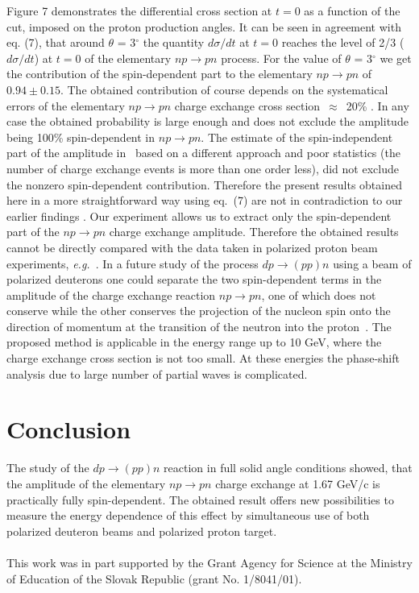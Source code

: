 \documentclass[epj]{svjour}
\begin{document}
Figure 7 demonstrates the differential cross section at $t=0$ as a function of
the cut, imposed on the proton production angles. It can be seen in agreement
with eq. (7), that around $\theta$ = 3$^\circ$ the quantity $d\sigma/dt$ at
$t=0$ reaches the level of 2/3 ($d\sigma/dt$) at $t=0$ of the elementary
$np\to pn$ process. For the value of $\theta$ = 3$^\circ$ we get the
contribution of the spin-dependent part to the elementary $np\to pn$ of
$0.94 \pm 0.15$. The obtained contribution of course depends on the systematical
errors of the elementary $np\to pn$ charge exchange cross section~$\approx$~20\%
\cite{She}. In any case the obtained probability is large enough and does not
exclude the amplitude being 100\% spin-dependent in $np\to pn$. The estimate of
the spin-independent part of the amplitude in~\cite{Ala} based on a different
approach and poor statistics (the number of charge exchange events is more than
one order less), did not exclude the nonzero spin-dependent
contribution. Therefore the present results obtained here in a more
straightforward way using eq.~(7) are not in contradiction to our earlier
findings \cite{Ala}. Our experiment allows us to extract only the spin-dependent
part of the $np\to pn$ charge exchange amplitude. Therefore the obtained results
cannot be directly compared with the data taken in polarized proton beam
experiments, \textit{e.g.}~\cite{Rans}. In a future study of the process
$dp\to (pp)n$ using a beam of polarized deuterons one could separate the two
spin-dependent terms in the amplitude of the charge exchange reaction
$np\to pn$, one of which does not conserve while the other conserves the
projection of the nucleon spin onto the direction of momentum at the transition
of the neutron into the proton~\cite{Gla}. The proposed method is applicable in
the energy range up to 10 GeV, where the charge exchange cross section is not
too small. At these energies the phase-shift analysis due to large number of
partial waves is complicated.

\newpage
\section{Conclusion}
The study of the $dp\to (pp)n$ reaction in full solid angle conditions showed,
that the amplitude of the elementary $np\to pn$ charge exchange at 1.67 GeV/c is
practically fully spin-dependent. The obtained result offers new possibilities
to measure the energy dependence of this effect by simultaneous use of both
polarized deuteron beams and polarized proton target.
\\ \\
This work was in part supported by the Grant Agency for Science at the Ministry
of Education of the Slovak Republic (grant No. 1/8041/01).
\end{document}
